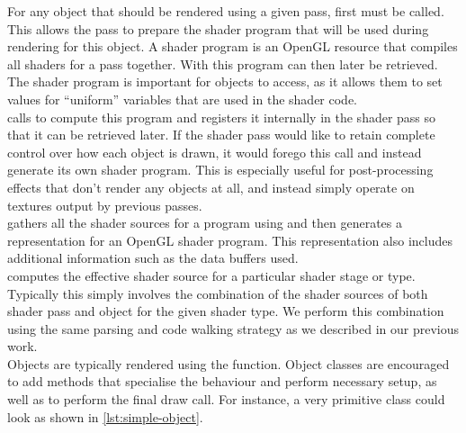 \documentclass[format=sigconf]{acmart}
\begin{document}
For any object that should be rendered using a given pass, first  must be called. This allows the pass to prepare the shader program that will be used during rendering for this object. A shader program is an OpenGL resource that compiles all shaders for a pass together. With  this program can then later be retrieved. The shader program is important for objects to access, as it allows them to set values for ``uniform'' variables that are used in the shader code. \\

 calls  to compute this program and registers it internally in the shader pass so that it can be retrieved later. If the shader pass would like to retain complete control over how each object is drawn, it would forego this call and instead generate its own shader program. This is especially useful for post-processing effects that don't render any objects at all, and instead simply operate on textures output by previous passes. \\

 gathers all the shader sources for a program using  and then generates a representation for an OpenGL shader program. This representation also includes additional information such as the data buffers used. \\

 computes the effective shader source for a particular shader stage or type. Typically this simply involves the combination of the shader sources of both shader pass and object for the given shader type. We perform this combination using the same parsing and code walking strategy as we described in our previous work.\cite{glsloop} \\

Objects are typically rendered using the  function. Object classes are encouraged to add methods that specialise the behaviour and perform necessary setup, as well as to perform the final draw call. For instance, a very primitive class could look as shown in \autoref{lst:simple-object}.
\end{document}
